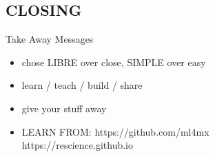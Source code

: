 \documentclass[compress]{beamer}
\begin{document}
\subsection{CLOSING}
{



    \begin{frame}{Take Away Messages}
	\LARGE

	\begin{itemize}
	\item chose LIBRE over close, SIMPLE over easy
	\item learn / teach / build / share
	\item give your stuff away 
	\item LEARN FROM:
	https://github.com/ml4mx \\
	https://rescience.github.io 
	\end{itemize}



   \end{frame}

}


\section{}
\closingtitle



\end{document}
